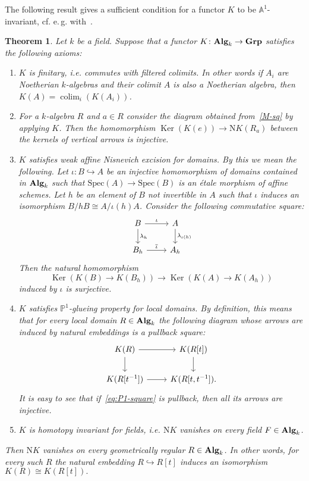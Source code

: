 \documentclass[oneside, 11pt]{amsart}
\numberwithin{equation}{section}
\newtheorem{theorem}[lemma]{Theorem}
\newcommand{\Ker}{\mathop{\mathrm{Ker}}\nolimits}
\theoremstyle{definition}
\theoremstyle{definition}
\theoremstyle{remark}
\DeclareMathOperator{\colim}{colim}
\newcommand{\catname}[1]{{\normalfont\textbf{#1}}} %
\begin{document}
The following result gives a sufficient condition for a functor $K$ to be $\mathbb{A}^1$-invariant, cf. e.\,g. with~\cite[Proposition~2.2]{AHW20}.
\begin{theorem} \label{lpb}
 Let $k$ be a field.
 Suppose that a functor $K \colon \catname{Alg}_k \to \catname{Grp}$ satisfies the following axioms:
 \begin{enumerate}[label=\textnormal{(A\arabic*)}]
  \item \label{CFC} {\it $K$ is finitary}, i.e. commutes with filtered colimits. In other words if $A_i$ are Noetherian $k$-algebras and their colimit $A$ is also a Noetherian algebra, then $K(A) = \colim_i(K(A_i))$.
  \item \label{DP} For a $k$-algebra $R$ and $a \in R$ consider the diagram obtained from~\eqref{M-sq} by applying $K$. Then the homomorphism $\Ker\left(K(e)\right) \to \mathrm NK(R_a)$ between the kernels of vertical arrows is injective.
  \item \label{LPP} {\it $K$ satisfies weak affine Nisnevich excision for domains.} By this we mean the following. Let $\iota \colon B \hookrightarrow A$ be an injective homomorphism of domains contained in $\catname{Alg}_k$ such that $\mathrm{Spec}(A)\to\mathrm{Spec}(B)$ is an {\'e}tale morphism of affine schemes. Let $h$ be an element of $B$ not invertible in $A$ such that $\iota$ induces an isomorphism $B / hB \cong A / \iota(h)A$. Consider the following commutative square: \[\begin{tikzcd} B \ar{r}{\iota} \ar{d}{\lambda_h} & A \ar{d}{\lambda_{\iota(h)}}\\ B_h \ar{r}{\overline{\iota}} & A_h \end{tikzcd}\] Then the natural homomorphism \[\Ker(K(B) \to K(B_h)) \to \Ker(K(A) \to K(A_h))\] induced by $\iota$ is surjective.
  \item \label{PGP} {\it $K$ satisfies $\mathbb{P}^1$-glueing property for local domains.} By definition, this means that for every local domain $R \in \catname{Alg}_k$ the following diagram whose arrows are induced by natural embeddings is a pullback square: \begin{equation}\label{eq:P1-square} \begin{tikzcd} K(R) \ar[r] \ar[d] & K(R[t]) \arrow{d} \\ K(R[t^{-1}]) \ar{r} & K(R[t, t^{-1}]). \end{tikzcd} \end{equation}  
  It is easy to see that if~\eqref{eq:P1-square} is pullback, then all its arrows are injective.
  \item \label{HIF} {\it $K$ is homotopy invariant for fields}, i.e. $\mathrm NK$ vanishes on every field $F \in \catname{Alg}_k$.
 \end{enumerate}
 Then $\mathrm NK$ vanishes on every geometrically regular $R\in \catname{Alg}_k$. In other words, for every such $R$ the natural embedding $R \hookrightarrow R[t]$ induces an isomorphism $K(R)\cong K(R[t]).$
\end{theorem}
\end{document}
